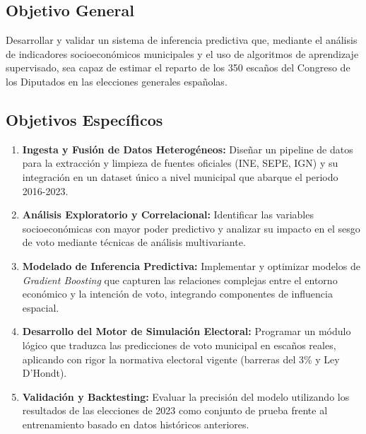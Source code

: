 \subsection{Objetivo General}
Desarrollar y validar un sistema de inferencia predictiva que, mediante el análisis de indicadores socioeconómicos municipales y el uso de algoritmos de aprendizaje supervisado, sea capaz de estimar el reparto de los 350 escaños del Congreso de los Diputados en las elecciones generales españolas.

\subsection{Objetivos Específicos}
\begin{enumerate}
    \item \textbf{Ingesta y Fusión de Datos Heterogéneos:} Diseñar un pipeline de datos para la extracción y limpieza de fuentes oficiales (INE, SEPE, IGN) y su integración en un dataset único a nivel municipal que abarque el periodo 2016-2023.
    \item \textbf{Análisis Exploratorio y Correlacional:} Identificar las variables socioeconómicas con mayor poder predictivo y analizar su impacto en el sesgo de voto mediante técnicas de análisis multivariante.
    \item \textbf{Modelado de Inferencia Predictiva:} Implementar y optimizar modelos de \textit{Gradient Boosting} que capturen las relaciones complejas entre el entorno económico y la intención de voto, integrando componentes de influencia espacial.
    \item \textbf{Desarrollo del Motor de Simulación Electoral:} Programar un módulo lógico que traduzca las predicciones de voto municipal en escaños reales, aplicando con rigor la normativa electoral vigente (barreras del 3\% y Ley D'Hondt).
    \item \textbf{Validación y Backtesting:} Evaluar la precisión del modelo utilizando los resultados de las elecciones de 2023 como conjunto de prueba frente al entrenamiento basado en datos históricos anteriores.
\end{enumerate}
